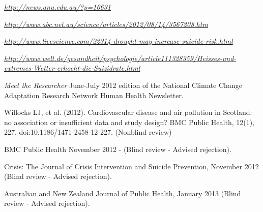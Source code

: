 \documentclass[a4paper,11pt]{article}
\begin{document}

\medskip
\renewcommand{\labelenumi}{\textsc{h}\theenumi.}
\begin{revnumerate}

\item \emph{\href{http://news.anu.edu.au/?p=16631}{http://news.anu.edu.au/?p=16631}}

\item \emph{\href{http://www.abc.net.au/science/articles/2012/08/14/3567208.htm}{http://www.abc.net.au/science/articles/2012/08/14/3567208.htm}}

\item \emph{\href{http://www.livescience.com/22314-drought-may-increase-suicide-risk.html}{http://www.livescience.com/22314-drought-may-increase-suicide-risk.html}}

\item \emph{\href{http://www.welt.de/gesundheit/psychologie/article111328359/Heisses-und-extremes-Wetter-erhoeht-die-Suizidrate.html}{http://www.welt.de/gesundheit/psychologie/article111328359/Heisses-und-extremes-Wetter-erhoeht-die-Suizidrate.html}}

\item \emph{Meet the Researcher} June-July 2012 edition of the National Climate Change Adaptation Research Network Human Health Newsletter.
\end{revnumerate}
{}
\medskip
\renewcommand{\labelenumi}{\textsc{i}\theenumi.}
\begin{revnumerate}

\item Willocks LJ, et al. (2012). Cardiovascular disease and air pollution in Scotland: no association or insufficient data and study design? BMC Public Health, 12(1), 227. doi:10.1186/1471-2458-12-227. (Nonblind review)

\item BMC Public Health November 2012 - (Blind review - Advised rejection).

\item Crisis: The Journal of Crisis Intervention and Suicide Prevention, November 2012 (Blind review - Advised rejection).

\item Australian and New Zealand Journal of Public Health, January 2013 (Blind review - Advised rejection).

\end{revnumerate}
\end{document}
